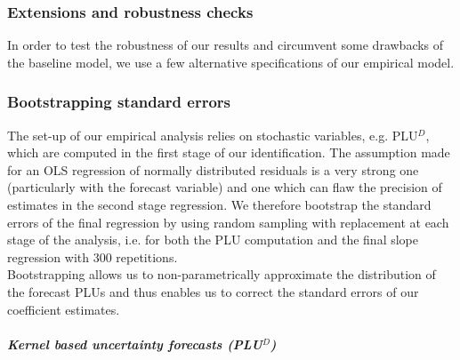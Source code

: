 \subsubsection{Extensions and robustness checks}
In order to test the robustness of our results and circumvent some drawbacks of the baseline model, we use a few alternative specifications of our empirical model. 

%



\subsubsection{Bootstrapping standard errors}
The set-up of our empirical analysis relies on stochastic variables, e.g. PLU$^D$, which are computed in the first stage of our identification. The assumption made for an OLS regression of normally distributed residuals is a very strong one (particularly with the forecast variable) and one which can flaw the precision of estimates in the second stage regression. 
We therefore bootstrap the standard errors of the final regression by using random sampling with replacement at each stage of the analysis, i.e. for both the PLU computation and the final slope regression  with 300 repetitions. \\%

Bootstrapping allows us to non-parametrically approximate the distribution of the forecast PLUs and thus enables us to correct the standard errors of our coefficient estimates. 

\subparagraph{Kernel based uncertainty forecasts (PLU$^D$)}
\label{robustunc}

